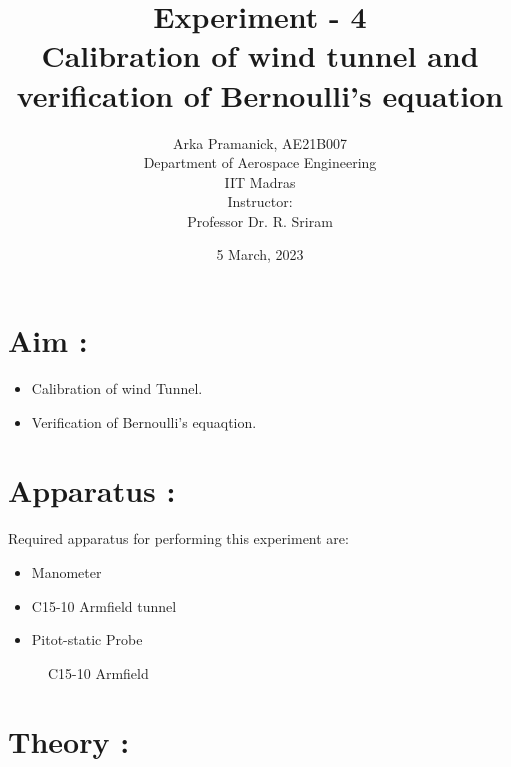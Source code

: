 \documentclass[12pt,a4paper]{article}
\title{{Experiment - 4\\ \textbf{Calibration of wind tunnel and verification of Bernoulli's equation}}}
\author{Arka Pramanick, AE21B007\\ Department of Aerospace Engineering\\ IIT Madras\\[3ex] Instructor:\\ \large Professor Dr. R. Sriram}
\date{5 March, 2023}
\begin{document}
\maketitle

\hline

\section{Aim :}
\begin{itemize}
    \item Calibration of wind Tunnel.
    \item Verification of Bernoulli's equaqtion.
\end{itemize}


\section{Apparatus :}
Required apparatus for performing this experiment are:
\begin{itemize}
    \item Manometer
    \item C15-10 Armfield tunnel
    \item Pitot-static Probe
\end{itemize}

\begin{figure}[!ht]
	\begin{center}
	\end{center}
	\caption{C15-10 Armfield}
\end{figure}


\newpage
\section{Theory :}
\end{document}
